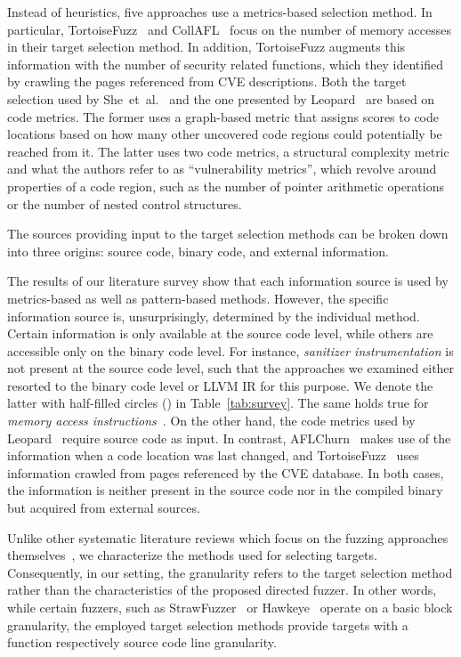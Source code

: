 Instead of heuristics, five approaches use a metrics-based selection method. In particular, TortoiseFuzz~\cite{WanJiaLiuZen+20} and CollAFL~\cite{GanZhaQinTu+18} focus on the number of memory accesses in their target selection method. In addition, TortoiseFuzz augments this information with the number of security related functions, which they identified by crawling the pages referenced from CVE descriptions. Both the target selection used by She~et~al.~\cite{SheShaJan22} and the one presented by Leopard~\cite{WüsChr20} are based on code metrics. The former uses a graph-based metric that assigns scores to code locations based on how many other uncovered code regions could potentially be reached from it. The latter uses two code metrics, a structural complexity metric and what the authors refer to as ``vulnerability metrics'', which revolve around properties of a code region, such as the number of pointer arithmetic operations or the number of nested control structures.

The sources providing input to the target selection methods can be broken down into three origins: source code, binary code, and external information. 

The results of our literature survey show that each information source is used by metrics-based as well as pattern-based methods. However, the specific information source is, unsurprisingly, determined by the individual method. Certain information is only available at the source code level, while others are accessible only on the binary code level. For instance, \emph{sanitizer instrumentation} is not present at the source code level, such that the approaches we examined either resorted to the binary code level or LLVM IR for this purpose. We denote the latter with half-filled circles (\LEFTcircle) in Table~\ref{tab:survey}. The same holds true for \emph{memory access instructions}~\cite{GanZhaQinTu+18, YuaZhaLiLia+23}. On the other hand, the code metrics used by Leopard~\cite{DuCheLiGuo+19} require source code as input. In contrast, AFLChurn~\cite{ZhuBöh21} makes use of the information when a code location was last changed, and TortoiseFuzz~\cite{WanJiaLiuZen+20} uses information crawled from pages referenced by the CVE database. In both cases, the information is neither present in the source code nor in the compiled binary but acquired from external sources.

\cstart
{}
Unlike other systematic literature reviews which focus on the fuzzing approaches themselves~\cite{WanZhoYueLin+24, LiaPeiJiaShe+18}, we characterize the methods used for selecting targets. 
%
Consequently, in our setting, the granularity refers to the target selection method rather than the characteristics of the proposed directed fuzzer. In other words, while certain fuzzers, such as StrawFuzzer~\cite{ZhaLiaXiaZha+22} or Hawkeye~\cite{CheXueLiChe+18} operate on a basic block granularity, the employed target selection methods provide targets with a function respectively source code line granularity.

